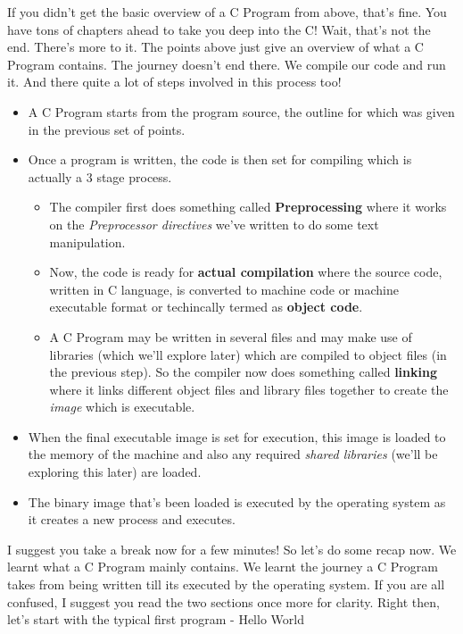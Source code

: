 If you didn't get the basic overview of a C Program from above, that's fine. You have tons of chapters ahead to take you deep into the C! Wait, that's not the end. There's more to it. The points above just give an overview of what a C Program contains. The journey doesn't end there. We compile our code and run it. And there quite a lot of steps involved in this process too!

\begin{itemize}
\item A C Program starts from  the program source, the outline for which was given in the previous set of points. 
\item Once a program is written, the code is then set for compiling which is actually a 3 stage process.
\begin{itemize} 
\item The compiler first does something called \textbf{Preprocessing} where it works on the \textit{Preprocessor directives} we've written to do some text manipulation.
\item Now, the code is ready for \textbf{actual compilation} where the source code, written in C language, is converted to machine code or machine executable format or techincally termed as \textbf{object code}.
\item A C Program may be written in several files and may make use of libraries (which we'll explore later) which are compiled to object files (in the previous step). So the compiler now does something called \textbf{linking} where it links different object files and library files together to create the \textit{image} which is executable.
\end{itemize}
\item When the final executable image is set for execution, this image is loaded to the memory of the machine and also any required \textit{shared libraries} (we'll be exploring this later) are loaded. 
\item The binary image that's been loaded is executed by the operating system as it creates a new process and executes. 
\end{itemize}

I suggest you take a break now for a few minutes! So let's do some recap now. We learnt what a C Program mainly contains. We learnt the journey a C Program takes from being written till its executed by the operating system. If you are all confused, I suggest you read the two sections once more for clarity. Right then, let's start with the typical first program - Hello World